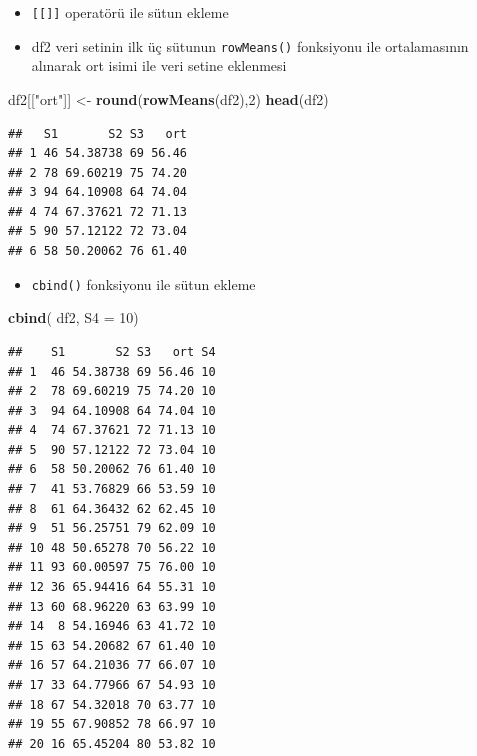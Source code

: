 \documentclass[
  oneside]{book}
\newenvironment{Shaded}{\begin{snugshade}}{\end{snugshade}}
\newcommand{\AttributeTok}[1]{\textcolor[rgb]{0.13,0.29,0.53}{#1}}
\newcommand{\DecValTok}[1]{\textcolor[rgb]{0.00,0.00,0.81}{#1}}
\newcommand{\FunctionTok}[1]{\textcolor[rgb]{0.13,0.29,0.53}{\textbf{#1}}}
\newcommand{\NormalTok}[1]{#1}
\newcommand{\OtherTok}[1]{\textcolor[rgb]{0.56,0.35,0.01}{#1}}
\newcommand{\StringTok}[1]{\textcolor[rgb]{0.31,0.60,0.02}{#1}}
\providecommand{\tightlist}{%
  \setlength{\itemsep}{0pt}\setlength{\parskip}{0pt}}
\begin{document}
\begin{itemize}
\item
  \texttt{{[}{[}{]}{]}} operatörü ile sütun ekleme
\item
  df2 veri setinin ilk üç sütunun \texttt{rowMeans()} fonksiyonu ile ortalamasının alınarak ort isimi ile veri setine eklenmesi
\end{itemize}

\begin{Shaded}
\begin{Highlighting}[]
\NormalTok{df2[[}\StringTok{"ort"}\NormalTok{]] }\OtherTok{\textless{}{-}} \FunctionTok{round}\NormalTok{(}\FunctionTok{rowMeans}\NormalTok{(df2),}\DecValTok{2}\NormalTok{)}
\FunctionTok{head}\NormalTok{(df2)}
\end{Highlighting}
\end{Shaded}

\begin{verbatim}
##   S1       S2 S3   ort
## 1 46 54.38738 69 56.46
## 2 78 69.60219 75 74.20
## 3 94 64.10908 64 74.04
## 4 74 67.37621 72 71.13
## 5 90 57.12122 72 73.04
## 6 58 50.20062 76 61.40
\end{verbatim}

\begin{itemize}
\tightlist
\item
  \texttt{cbind()} fonksiyonu ile sütun ekleme
\end{itemize}

\begin{Shaded}
\begin{Highlighting}[]
\FunctionTok{cbind}\NormalTok{( df2, }\AttributeTok{S4 =} \DecValTok{10}\NormalTok{)}
\end{Highlighting}
\end{Shaded}

\begin{verbatim}
##    S1       S2 S3   ort S4
## 1  46 54.38738 69 56.46 10
## 2  78 69.60219 75 74.20 10
## 3  94 64.10908 64 74.04 10
## 4  74 67.37621 72 71.13 10
## 5  90 57.12122 72 73.04 10
## 6  58 50.20062 76 61.40 10
## 7  41 53.76829 66 53.59 10
## 8  61 64.36432 62 62.45 10
## 9  51 56.25751 79 62.09 10
## 10 48 50.65278 70 56.22 10
## 11 93 60.00597 75 76.00 10
## 12 36 65.94416 64 55.31 10
## 13 60 68.96220 63 63.99 10
## 14  8 54.16946 63 41.72 10
## 15 63 54.20682 67 61.40 10
## 16 57 64.21036 77 66.07 10
## 17 33 64.77966 67 54.93 10
## 18 67 54.32018 70 63.77 10
## 19 55 67.90852 78 66.97 10
## 20 16 65.45204 80 53.82 10
\end{verbatim}
\end{document}
